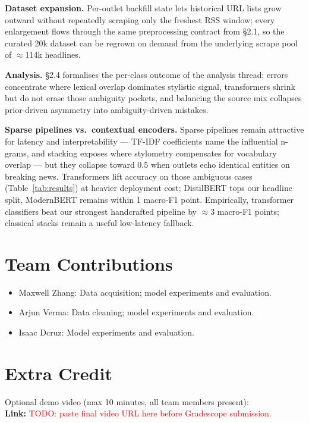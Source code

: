 \documentclass[10pt]{article}
\begin{document}
\textbf{Dataset expansion.} Per-outlet backfill state lets historical URL lists grow outward without repeatedly scraping only the freshest RSS window; every enlargement flows through the same preprocessing contract from §2.1, so the curated 20k dataset can be regrown on demand from the underlying scrape pool of $\approx$114k headlines.

\textbf{Analysis.} §2.4 formalises the per-class outcome of the analysis thread: errors concentrate where lexical overlap dominates stylistic signal, transformers shrink but do not erase those ambiguity pockets, and balancing the source mix collapses prior-driven asymmetry into ambiguity-driven mistakes.

\textbf{Sparse pipelines vs.\ contextual encoders.} Sparse pipelines remain attractive for latency and interpretability --- TF-IDF coefficients name the influential n-grams, and stacking exposes where stylometry compensates for vocabulary overlap --- but they collapse toward 0.5 when outlets echo identical entities on breaking news. Transformers lift accuracy on those ambiguous cases (Table~\ref{tab:results}) at heavier deployment cost; DistilBERT tops our headline split, ModernBERT remains within 1 macro-F1 point. Empirically, transformer classifiers beat our strongest handcrafted pipeline by $\approx$3 macro-F1 points; classical stacks remain a useful low-latency fallback.

\section{Team Contributions}
\begin{itemize}
    \item Maxwell Zhang: Data acquisition; model experiments and evaluation.
    \item Arjun Verma: Data cleaning; model experiments and evaluation.
    \item Isaac Dcruz: Model experiments and evaluation.
\end{itemize}

\section{Extra Credit}
Optional demo video (max 10 minutes, all team members present):\\
\textbf{Link:} \textcolor{red}{TODO: paste final video URL here before Gradescope submission.}
\end{document}
